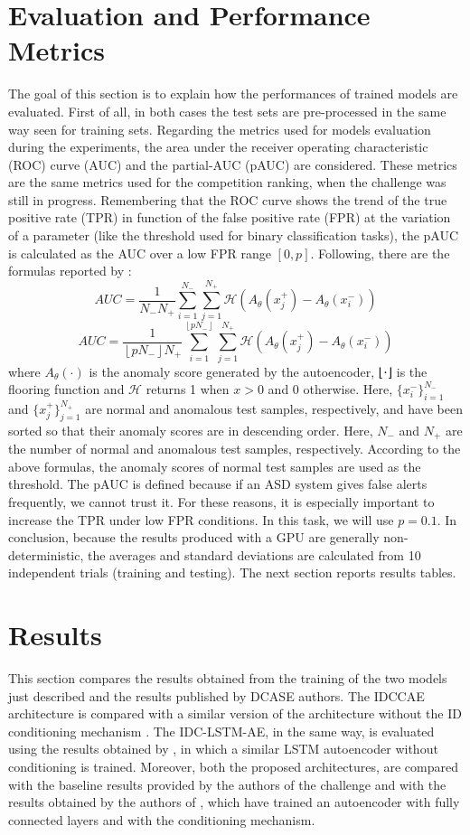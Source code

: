 \section{Evaluation and Performance Metrics}
The goal of this section is to explain how the performances of trained models are evaluated. First of all, in both cases the test sets are pre-processed in the same way seen for training sets. Regarding the metrics used for models evaluation during the experiments, the area under the receiver operating characteristic (ROC) curve (AUC) and the partial-AUC (pAUC) are considered. These metrics are the same metrics used for the competition ranking, when the challenge was still in progress. Remembering that the ROC curve shows the trend of the true positive rate (TPR) in function of the false positive rate (FPR) at the variation of a parameter (like the threshold used for binary classification tasks), the pAUC is calculated as the AUC over a low FPR range $[0,p]$. Following, there are the formulas reported by \cite{DCASE}:
\[ AUC =\frac{1}{N_-N_+}\sum_{i=1}^{N_-}\sum_{j=1}^{N_+}\mathcal{H}(A_\theta(x_j^+)-A_\theta(x_i^-)) \]
\[AUC =\frac{1}{ \left \lfloor pN_- \right \rfloor N_+}\sum_{i=1}^{ \left \lfloor pN_- \right \rfloor }\sum_{j=1}^{N_+}\mathcal{H}(A_\theta(x_j^+)-A_\theta(x_i^-))\]
where $A_\theta(\cdot)$ is the anomaly score generated by the autoencoder, ⌊⋅⌋ is the flooring function and $\mathcal{H}$ returns 1 when $x>0$ and $0$ otherwise. Here, $\{x^−_i\}^{N_-}_{i=1}$
and $\{x^+_j\}^{N_+}_{j=1}$ are normal and anomalous test samples, respectively, and have been sorted so that their anomaly scores are in descending order. Here, $N_−$ and $N_+$
are the number of normal and anomalous test samples, respectively. According to the above formulas, the anomaly scores of normal test samples are used as the threshold. The pAUC is defined because if an ASD system gives false alerts frequently, we cannot trust it. For these reasons, it is especially important to increase the TPR under low FPR conditions. In this task, we will use $p=0.1$. In conclusion, because the results produced with a GPU are generally non-deterministic, the averages and standard deviations are calculated from 10 independent trials (training and testing). The next section reports results tables.

\section{Results}
This section compares the results obtained from the training of the two models just described and the results published by DCASE authors. The IDCCAE architecture is compared with a similar version of the architecture without the ID conditioning mechanism \cite{15DeepDenseConvAE}. The IDC-LSTM-AE, in the same way, is evaluated using the results obtained by \cite{16LSTMDeepAutoencodersForASDtask}, in which a similar LSTM autoencoder without conditioning is trained. 
Moreover, both the proposed architectures, are compared with the baseline results provided by the authors of the challenge and with the results obtained by the authors of \cite{18IDConditionedAutoEncoder}, which have trained an autoencoder with fully connected layers and with the conditioning mechanism.

